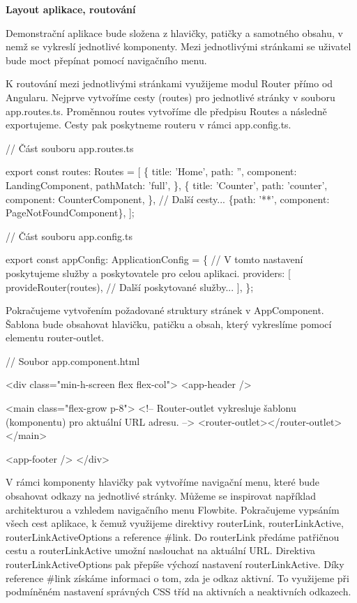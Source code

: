 \begin{flushleft}
  \textbf{Layout aplikace, routování}
\end{flushleft}

Demonstrační aplikace bude složena z hlavičky, patičky a samotného obsahu, v nemž se vykreslí jednotlivé komponenty. 
Mezi jednotlivými stránkami se uživatel bude moct přepínat pomocí navigačního menu.

K routování mezi jednotlivými stránkami využijeme modul Router přímo od Angularu. Nejprve vytvoříme cesty (routes) pro jednotlivé stránky v souboru app.routes.ts. 
Proměnnou routes vytvoříme dle předpisu Routes a následně exportujeme. Cesty pak poskytneme routeru v rámci app.config.ts.

\begin{prog}
// Část souboru app.routes.ts

export const routes: Routes = [
  \{
    title: 'Home',
    path: '',
    component: LandingComponent,
    pathMatch: 'full',
  \},
  \{
    title: 'Counter',
    path: 'counter',
    component: CounterComponent,
  \},
  // Další cesty...
  \{path: '**', component: PageNotFoundComponent\},
];

// Část souboru app.config.ts

export const appConfig: ApplicationConfig = \{
  // V tomto nastavení poskytujeme služby a poskytovatele pro celou aplikaci.
  providers: [
    provideRouter(routes),
    // Další poskytované služby...
  ],
\};
\end{prog}

Pokračujeme vytvořením požadované struktury stránek v AppComponent. Šablona bude obsahovat hlavičku, patičku a obsah, který vykreslíme pomocí elementu router-outlet. 

\begin{prog}
// Soubor app.component.html

<div class="min-h-screen flex flex-col">
  <app-header />

  <main class="flex-grow p-8">
    <!-- Router-outlet vykresluje šablonu (komponentu) pro aktuální URL adresu. -->
    <router-outlet></router-outlet>
  </main>

  <app-footer />
</div>
\end{prog}

V rámci komponenty hlavičky pak vytvoříme navigační menu, které bude obsahovat odkazy na jednotlivé stránky. 
Můžeme se inspirovat například architekturou a vzhledem navigačního menu Flowbite. 
Pokračujeme vypsáním všech cest aplikace, k čemuž využijeme direktivy routerLink, routerLinkActive, routerLinkActiveOptions a reference \#link. 
Do routerLink předáme patřičnou cestu a routerLinkActive umožní naslouchat na aktuální URL. Direktiva routerLinkActiveOptions pak přepíše výchozí nastavení routerLinkActive.
Díky reference \#link získáme informaci o tom, zda je odkaz aktivní. To využijeme při podmíněném nastavení správných CSS tříd na aktivních a neaktivních odkazech.

